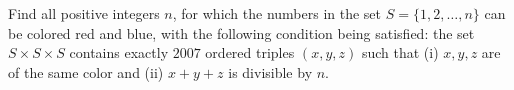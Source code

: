 Find all positive integers $n$, for which the numbers in the set $S = \{1, 2, \ldots, n\}$ can be colored red and blue, with the following condition being satisfied: the set $S \times S \times S$ contains exactly $2007$ ordered triples $(x, y, z)$ such that (i) $x, y, z$ are of the same color and (ii) $x + y + z$ is divisible by $n$.
